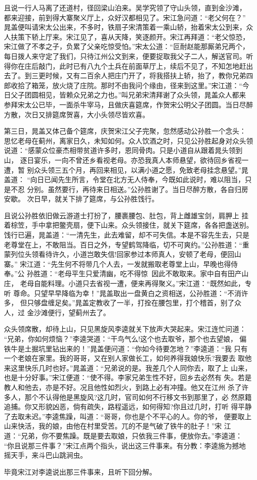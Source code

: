 且说一行人马离了还道村，径回梁山泊来。吴学究领了守山头领，直到金沙滩，
都来迎接，前到得大寨聚义厅上，众好汉都相见了。宋江急问道：“老父何在？”
晁盖便叫请宋太公出来，不多时，铁扇子宋清策着一乘山轿，抬着宋太公到来，众
人扶策下轿上厅来。宋江见了，喜从天降，笑逐颜开。宋江再拜道：“老父惊恐，
宋江做了不孝之子，负累了父亲吃惊受怕。”宋太公道：“叵耐赵能那厮弟兄两个，
每日拨人来守定了我们，只待江州公文到来，便要捉取我父子二人，解送官司。听
得你在庄后敲门，此时已有八九个土兵在前面草厅上，续后不见了，不知怎地赶出
去了。到三更时候，又有二百余人把庄门开了，将我搭扶上轿，抬了，教你兄弟四
郎收拾了箱笼，放火烧了庄院。那时不由我问个缘由，径来到这里。”宋江道：“今
日父子团圆相见，皆赖众兄弟之力也。”叫兄弟宋清拜谢了众头领，晁盖众人都来
参拜宋太公已毕，一面杀牛宰马，且做庆喜筵席，作贺宋公明父子团圆。当日尽醉
方散，次日又排筵席贺喜，大小头领尽皆欢喜。

第三日，晁盖又体己备个筵席，庆贺宋江父子完聚，忽然感动公孙胜一个念头：
思忆老母在蓟州，离家日久，未知如何。众人饮酒之时，只见公孙胜起身对众头领
说道：“感蒙众位豪杰相带贫道许多时，恩同骨肉。只是小道自从跟着晁头领到山，
逐日宴乐，一向不曾还乡看视老母。亦恐我真人本师悬望，欲待回乡省视一遭，暂
别众头领三五个月，再回来相见，以满小道之愿，免致老母挂念悬望。”晁盖道：
“向日已闻先生所言，令堂在北方无人侍奉，今既如此说时，难以阻当，只是不忍
分别。虽然要行，再待来日相送。”公孙胜谢了。当日尽醉方散，各自归房安歇。
次日早，就关下排了筵席，与公孙胜饯行。

且说公孙胜依旧做云游道士打扮了，腰裹腰包、肚包，背上雌雄宝剑，肩胛上
挂着棕笠，手中拿把鳖壳扇，便下山来。众头领接住，就关下筵席，各各把盏送别。
饯行已遍，晁盖道：“一清先生，此去难留，却不可失信。本是不容先生去，只是
老尊堂在上，不敢阻当。百日之外，专望鹤驾降临，切不可爽约。”公孙胜道：“重
蒙列位头领看待许久，小道岂敢失信!回家参过本师真人，安顿了老母，便回山寨。”
宋江道：“先生何不将带几个人去，一发就搬取老尊堂上山，早晚也得侍奉。”公
孙胜道：“老母平生只爱清幽，吃不得惊，因此不敢取来。家中自有田产山庄，
老母自能料理。小道只去省视一遭，便来再得聚义。”宋江道：“既然如此，专听
尊命。只望早早降临为幸！”晁盖取出一盘黄白之资相送，公孙胜道：“不消许多，
但只够盘缠足矣。”晁盖定教收了一半，打拴在腰包里，打个稽首，别了众人，过
金沙滩便行，望蓟州去了。

众头领席散，却待上山，只见黑旋风李逵就关下放声大哭起来。宋江连忙问道：
“兄弟，你如何烦恼？”李逵哭道：“干鸟气么!这个也去取爷，那个也去望娘，
偏铁牛是土掘坑里钻出来的！”晁盖便问道：“你如今待要怎地？”李逵道：“我
只有一个老娘在家里。我的哥哥，又在别人家做长工，如何养得我娘快乐?我要去
取他来这里快乐几时也好。”晁盖道：“兄弟说的是。我差几个人同你去，取了上
山来，也是十分好事。”宋江便道：“使不得。李家兄弟生性不好，回乡去必然有
失。若是教人和他去，亦是不好。况且他性如烈火，到路上必有冲撞。他又在江州
杀了许多人，那个不认得他是黑旋风?这几时，官司如何不行移文书到那里了，必
然原籍追捕。你又形貌凶恶，倘有疏失，路程遥远，如何得知?你且过几时，打听
得平静了去取未迟。”李逵焦躁，叫道：“哥哥，你也是个不平心的人。你的爷，
便要取上山来快活，我的娘，由他在村里受苦。兀的不是气破了铁牛的肚子！”宋
江道：“兄弟，你不要焦躁。既是要去取娘，只依我三件事，便放你去。”李逵道：
“你且说那三件事？”宋江点两个指头，说出这三件事来。有分教：李逵施为撼地
摇天手，来斗巴山跳涧虫。

毕竟宋江对李逵说出那三件事来，且听下回分解。
